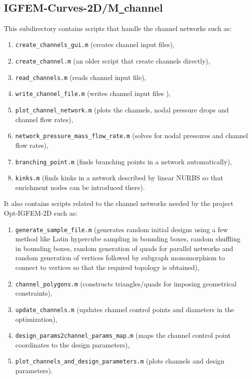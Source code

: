 \documentclass[11pt,letterpaper]{article}
\begin{document}
\FloatBarrier

\subsection{IGFEM-Curves-2D/M\texttt{\_}channel}
\label{subsec_M_channel}
This subdirectory contains scripts that handle the channel networks such as:
\begin{enumerate}
\item \texttt{create\_channels\_gui.m} (creates channel input files),
\item \texttt{create\_channel.m} (an older script that create channels directly),
\item \texttt{read\_channels.m} (reads channel input file),
\item \texttt{write\_channel\_file.m} (writes channel input files ),
\item \texttt{plot\_channel\_network.m} (plots the channels, nodal pressure drops and channel flow rates),
\item \texttt{network\_pressure\_mass\_flow\_rate.m} (solves for nodal pressures and channel flow rates),
\item \texttt{branching\_point.m} (finds branching points in a network automatically),
\item \texttt{kinks.m} (finds kinks in a network described by linear NURBS so that enrichment nodes can be introduced there).
\end{enumerate}
  
It also contains scripts related to the channel networks needed by the project Opt-IGFEM-2D such as:
\begin{enumerate}
\item \texttt{generate\_sample\_file.m} (generates random initial designs using a few method like Latin hypercube sampling in bounding boxes, random shuffling in bounding boxes, random generation of quads for parallel networks and random generation of vertices followed by subgraph monomorphism to connect to vertices so that the required topology is obtained),
\item \texttt{channel\_polygons.m} (constructs triangles/quads for imposing geometrical constraints), 
\item \texttt{update\_channels.m} (updates channel control points and diameters in the optimization),
\item \texttt{design\_params2channel\_params\_map.m} (maps the channel control point coordinates to the design parameters),
\item \texttt{plot\_channels\_and\_design\_parameters.m} (plots channels and design parameters). 
\end{enumerate}
 
\end{document}
